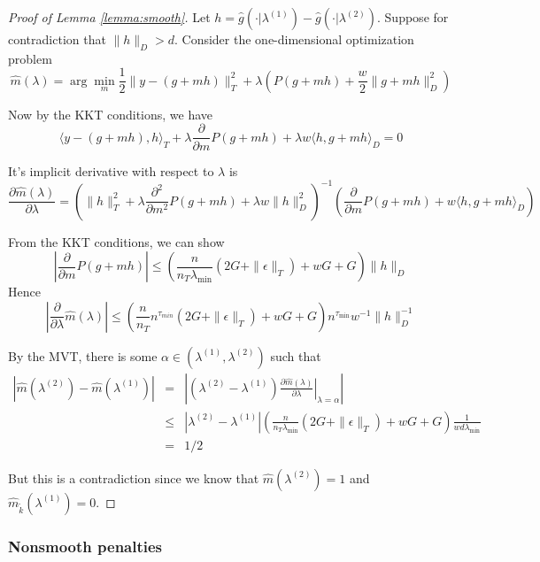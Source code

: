 \documentclass[12pt]{article}
\begin{document}
\begin{proof}[Proof of Lemma \ref{lemma:smooth}]

Let $h=\hat{g}(\cdot|\lambda^{(1)})-\hat{g}(\cdot|\lambda^{(2)})$. Suppose for contradiction that $\|h\|_{D} > d$.
Consider the one-dimensional optimization problem
\[
\hat{m}(\lambda) = \arg\min_{m}\frac{1}{2}\|y- \left(g +mh\right)\|_{T}^{2}+\lambda\left(P(g+mh)+\frac{w}{2}\|g+mh\|_{D}^{2}\right)
\]

Now by the KKT conditions, we have
\[
\langle y-\left(g+mh\right),h\rangle_{T}+\lambda\frac{\partial}{\partial m}P(g+mh)+\lambda w \langle h,g+mh\rangle_{D}=0
\]


It's implicit derivative with respect to $\lambda$ is
\begin{equation}
 \frac{\partial\hat{m}(\lambda)}{\partial\lambda}  =
\left ( \| h\|_{T}^2 +\lambda\frac{\partial^{2}}{\partial m^{2}}P(g+mh) +\lambda w\|h\|_{D}^{2} \right )^{-1}
\left ( \frac{\partial}{\partial m}P(g+mh)+w\langle h,g+mh\rangle_{D} \right )
\end{equation}

From the KKT conditions, we can show
\[
\left | \frac{\partial}{\partial m}P(g+mh) \right |  \le
\left(\frac{n}{n_{T} \lambda_{\min}}\left(2G+\|\epsilon\|_{T}\right)+wG+G\right)  \|h\|_{D}
\]
Hence
\[
\left|\frac{\partial}{\partial\lambda}\hat{m}(\lambda)\right| \le
\left(\frac{n}{n_{T}}n^{\tau_{min}}\left(2G+\|\epsilon\|_{T}\right)+wG+G\right)n^{\tau_{\min}}w^{-1}\|h\|_{D}^{-1}
\]

By the MVT, there is some $\alpha\in (\lambda^{(1)},\lambda^{(2)})$ such that
\begin{eqnarray*}
\left|\hat{m}(\lambda^{(2)})-\hat{m}(\lambda^{(1)})\right| & = &
\left|\left ( \lambda^{(2)}-\lambda^{(1)} \right )
\left . \frac{\partial \hat{m}(\lambda) }{\partial\lambda}\right |_{\lambda=\alpha} \right|\\
 & \le & |\lambda^{(2)}-\lambda^{(1)}|
\left(\frac{n}{n_{T} \lambda_{\min} }\left(2G+\|\epsilon\|_{T}\right)+wG+G\right)\frac{1}{wd \lambda_{\min} } \\
 & = & 1/2
\end{eqnarray*}


But this is a contradiction since we know that $\hat{m}(\lambda^{(2)})=1$
and $\hat{m}_{\tilde{k}}(\lambda^{(1)})=0$.
\end{proof}

\subsubsection{Nonsmooth penalties}\label{sec:nonsmooth}
\end{document}
